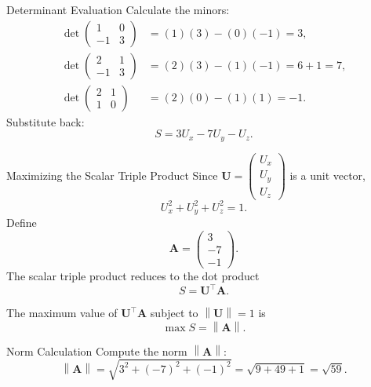 \documentclass{beamer}
\let\vec\mathbf
\theoremstyle{remark}
\providecommand{\norm}[1]{\left\lVert#1\right\rVert}
\newcommand{\myvec}[1]{\ensuremath{\begin{pmatrix}#1\end{pmatrix}}}
\begin{document}
\begin{frame}{Determinant Evaluation}
    Calculate the minors:
    \begin{align}
    \det\myvec{1 & 0 \\ -1 & 3} &= (1)(3) - (0)(-1) = 3, \label{eq:minor1} \\
    \det\myvec{2 & 1 \\ -1 & 3} &= (2)(3) - (1)(-1) = 6 + 1 = 7, \label{eq:minor2} \\
    \det\myvec{2 & 1 \\ 1 & 0} &= (2)(0) - (1)(1) = -1. \label{eq:minor3}
    \end{align}
    Substitute back:
    \begin{equation}
    S = 3U_x - 7U_y - U_z.
    \label{eq:scalar_trip_expanded}
    \end{equation}
\end{frame}

\begin{frame}{Maximizing the Scalar Triple Product}
    Since \(\vec{U} = \myvec{U_x \\ U_y \\ U_z}\) is a unit vector,
    \begin{equation}
    U_x^2 + U_y^2 + U_z^2 = 1.
    \label{eq:unit_vec}
    \end{equation}
    Define 
    \begin{equation}
    \vec{A} = \myvec{3 \\ -7 \\ -1}.
    \label{eq:vecA_def}
    \end{equation}
    The scalar triple product reduces to the dot product
    \begin{equation}
    S = \vec{U}^\top \vec{A}.
    \label{eq:scalar_dot}
    \end{equation}

    The maximum value of \(\vec{U}^\top \vec{A}\) subject to \(\norm{\vec{U}}=1\) is 
    \begin{equation}
    \max S = \norm{\vec{A}}.
    \label{eq:max_scalar}
    \end{equation}
\end{frame}

\begin{frame}{Norm Calculation}
    Compute the norm \(\norm{\vec{A}}\):
    \begin{equation}
    \norm{\vec{A}} = \sqrt{3^2 + (-7)^2 + (-1)^2} = \sqrt{9 + 49 + 1} = \sqrt{59}.
    \label{eq:norm_calc}
    \end{equation}
\end{frame}
\end{document}
